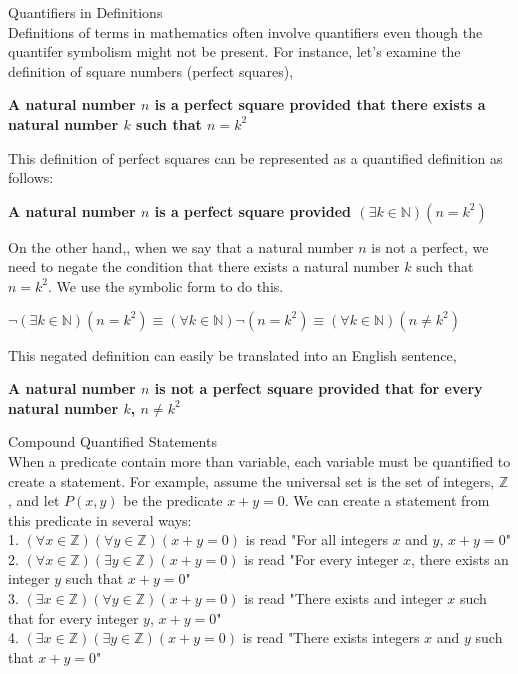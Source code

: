 \begin{definition}
Quantifiers in Definitions \\

Definitions of terms in mathematics often involve quantifiers even though the quantifer symbolism might not be present. For instance, let's examine the definition of square numbers (perfect squares), 
	\begin{center}
	\bf A natural number $n$ is a perfect square provided that there exists a natural number $k$ such that $n = k^2$
	\end{center}
This definition of perfect squares can be represented as a quantified definition as follows:
	\begin{center}
	\bf A natural number $n$ is a perfect square provided $(\exists k \in \mathbb{N})(n = k^2)$
	\end{center}
On the other hand,, when we say that a natural number $n$ is not a perfect, we need to negate the condition that there exists a natural number $k$ such that $n = k^2$. We use the symbolic form to do this. 
	\begin{center}
	$\neg(\exists k \in \mathbb{N})(n = k^2) \equiv (\forall k \in \mathbb{N})\neg(n = k^2) \equiv (\forall k \in \mathbb{N})(n \neq k^2)$
	\end{center}
This negated definition can easily be translated into an English sentence, 
	\begin{center}
	\bf A natural number $n$ is not a perfect square provided that for every natural number $k$, $n \neq k^2$
	\end{center}
\end{definition}


\begin{definition}
Compound Quantified Statements \\

When a predicate contain more than variable, each variable must be quantified to create a statement. For example, assume  the universal set is the set of integers, $\mathbb{Z}$, and let $P(x,y)$ be the predicate $x + y = 0$. We can create a statement from this predicate in several ways: \\
1. $(\forall x \in \mathbb{Z})(\forall y \in \mathbb{Z})(x + y = 0)$ is read "For all integers $x$ and $y$, $x + y = 0$" \\
2. $(\forall x \in \mathbb{Z})(\exists y \in \mathbb{Z})(x + y = 0)$ is read "For every integer $x$, there exists an integer $y$ such that $x + y = 0$"\\
3. $(\exists x \in \mathbb{Z})(\forall y \in \mathbb{Z})(x + y = 0)$ is read "There exists and integer $x$ such that for every integer $y$, $x + y = 0$"\\
4. $(\exists x \in \mathbb{Z})(\exists y \in \mathbb{Z})(x + y = 0)$ is read "There exists integers $x$ and $y$ such that $x + y = 0$" \\
\end{definition}


